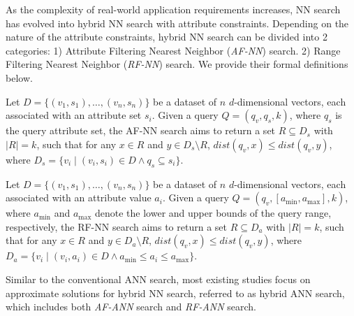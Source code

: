 \documentclass[sigconf, nonacm]{acmart}
\begin{document}
	As the complexity of real-world application requirements increases, NN search has evolved into hybrid NN search with attribute constraints. Depending on the nature of the attribute constraints, hybrid NN search can be divided into 2 categories: 1) Attribute Filtering Nearest Neighbor (\textit{AF-NN}) search. 2) Range Filtering Nearest Neighbor (\textit{RF-NN}) search. We provide their formal definitions below.
	
	\begin{definition}[AF-NN Search]
		Let \( D = \{(v_1, s_1), \ldots, (v_n, s_n)\} \) be a dataset of \( n \) \( d \)-dimensional vectors, each associated with an attribute set \( s_i \). Given a query \( Q = (q_v, q_s, k) \), where \( q_s \) is the query attribute set, the AF-NN search aims to return a set \( R \subseteq D_s \) with \( |R| = k \), such that for any \( x \in R \) and \( y \in D_s \setminus R \), \( \textit{dist}(q_v, x) \leq \textit{dist}(q_v, y) \), where \( D_s = \{ v_i \mid (v_i, s_i) \in D \land q_s \subseteq s_i \} \).
	\end{definition}
	
	
	\begin{definition}[RF-NN Search]
		
		Let \( D = \{(v_1, s_1), \ldots, (v_n, s_n)\} \) be a dataset of \( n \) \( d \)-dimensional vectors, each associated with an attribute value \( a_i \). Given a query \( Q = (q_v, [a_{\min}, a_{\max}], k) \), where \( a_{\min} \) and \( a_{\max} \) denote the lower and upper bounds of the query range, respectively, the RF-NN search aims to return a set \( R \subseteq D_a \) with \( |R| = k \), such that for any \( x \in R \) and \( y \in D_a \setminus R \), \( \textit{dist}(q_v, x) \leq \textit{dist}(q_v, y) \), where \( D_a = \{ v_i \mid (v_i, a_i) \in D \land a_{\min} \leq a_i \leq a_{\max} \} \).
	\end{definition}
	
	
	
	Similar to the conventional ANN search, most existing studies focus on approximate solutions for hybrid NN search, referred to as hybrid ANN search, which includes both \textit{AF-ANN} search and \textit{RF-ANN} search.
	
\end{document}
